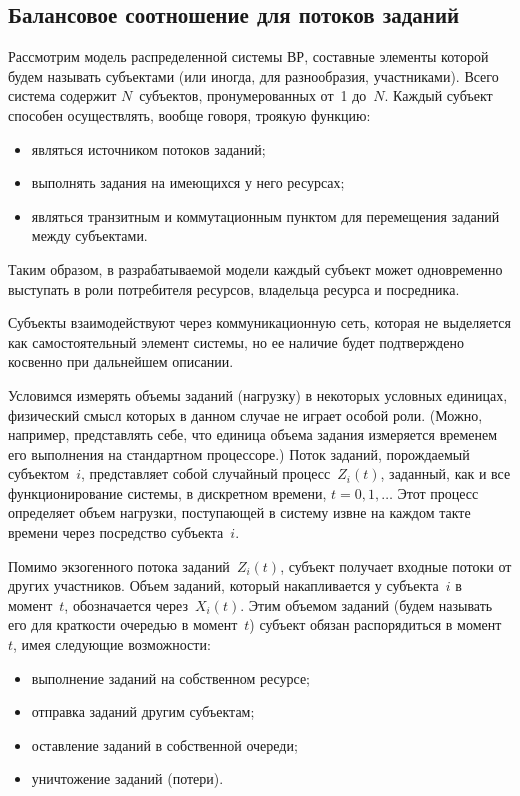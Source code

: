 \begin{multicols}{2}
\subsection{Балансовое соотношение для потоков заданий}

  Рассмотрим модель распределенной системы ВР, составные элементы которой будем 
называть субъектами (или иногда, для разнообразия, участниками). Всего система содержит 
$N$~субъектов, пронумерованных от~1 до~$N$. Каждый субъект способен 
осуществлять, вообще говоря, троякую функцию:
  \begin{itemize}
  \item являться источником потоков заданий;
  \item выполнять задания на имеющихся у него ресурсах;
\item являться транзитным и коммутационным пунктом для перемещения заданий между 
субъек\-тами. 
\end{itemize}
Таким образом, в разрабатываемой модели каждый субъект может одновременно выступать 
в роли потребителя ресурсов, владельца ресурса и посредника.
  
  Субъекты взаимодействуют через коммуникационную сеть, которая не выделяется как 
самостоятельный элемент системы, но ее наличие будет подтверждено косвенно при 
дальнейшем описании.
  
  Условимся измерять объемы заданий (нагрузку) в некоторых условных единицах, 
физический смысл которых в данном случае не играет особой роли. (Можно, например, 
представлять себе, что единица объема задания измеряется временем его выполнения на 
стандартном процессоре.) Поток заданий, порождаемый субъектом~$i$, представляет собой 
случайный процесс~$Z_i(t)$, заданный, как и все функционирование системы, в дискретном 
времени, $t=0,1,\ldots$ Этот процесс определяет объем нагрузки, поступающей в систему 
извне на каждом такте времени через посредство субъекта~$i$.
  
  Помимо экзогенного потока заданий~$Z_i(t)$, субъект получает входные потоки от 
других участников. Объем заданий, который накапливается у субъекта~$i$ в момент~$t$, 
обозначается через~$X_i(t)$. Этим объемом заданий (будем называть его для краткости 
очередью в момент~$t$) субъект обязан распорядиться в момент~$t$, имея 
следующие возможности:
  \begin{itemize}
  \item выполнение заданий на собственном ресурсе;
  \item отправка заданий другим субъектам;
  \columnbreak
  \item оставление заданий в собственной очереди;
  \item уничтожение заданий (потери).
  \end{itemize}
  

\end{multicols}
